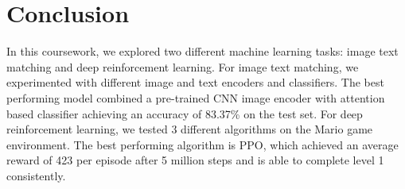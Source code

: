 \documentclass[conference]{IEEEtran}
\begin{document}
\section{Conclusion}

In this coursework, we explored two different machine learning tasks: image text matching and deep reinforcement learning. For image text matching, we experimented with different image and text encoders and classifiers. The best performing model combined a pre-trained CNN image encoder with attention based classifier achieving an accuracy of 83.37\% on the test set. For deep reinforcement learning, we tested 3 different algorithms on the Mario game environment. The best performing algorithm is PPO, which achieved an average reward of 423 per episode after 5 million steps and is able to complete level 1 consistently.



\end{document}
